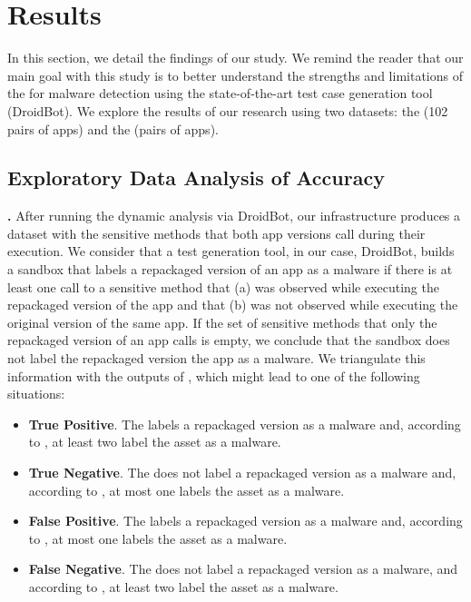 \section{Results}\label{sec:results}


In this section, we detail the findings of our study.  We remind the reader that our main goal with this study is to
better understand the strengths and limitations of the \mas for malware detection using the state-of-the-art
test case generation tool (DroidBot). We explore
the results of our research using two datasets: the \sds (102 pairs of apps) and the
\cds (\apps pairs of apps).


\subsection{Exploratory Data Analysis of Accuracy}


{\bf \sds.}
After running the dynamic analysis via DroidBot, our infrastructure produces
a dataset with the sensitive methods that both app versions call during their execution. We consider that a test
generation tool, in our case, DroidBot, builds a sandbox that labels a repackaged version
of an app as a malware if there is at least one call to a sensitive method that (a) was observed
while executing the repackaged version of the app and that (b) was not observed while
executing the original version of the same app. 
If the set of sensitive methods that only the repackaged version of an app calls is empty,
we conclude that the sandbox does not label the repackaged version the app as a malware. We triangulate
this information with the outputs of \vt, which might lead to one of the following
situations:

\begin{itemize}
\item {\bf True Positive}. The \mas labels a repackaged version as a malware and, according to
  \vt, at least two \ses label the asset as a malware.
  
\item {\bf True Negative}. The \mas does not label a repackaged version as a malware and,
  according to \vt, at most one \se labels the asset as a malware. 

\item {\bf False Positive}. The \mas labels a repackaged version as a malware and, according to
  \vt, at most one \se labels the asset as a malware.

\item {\bf False Negative}. The \mas does not label a repackaged version as a malware, and
  according to \vt, at least two \ses label the asset as a malware.
\end{itemize}


